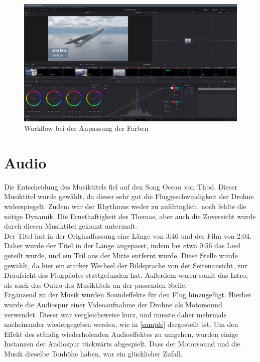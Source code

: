 \begin{figure}[H]
\begin{center}
\includegraphics[width=\textwidth]{gfx/post/resolve7.jpg}
\caption{Workflow bei der Anpassung der Farben}
\label{resolve7}
\end{center}
\end{figure}

\section{Audio}

Die Entscheidung des Musiktitels fiel auf den Song Ocean von Thbd. Dieser Musiktitel wurde gewählt, da dieser sehr gut die Fluggeschwindigkeit der Drohne widerspiegelt. Zudem war der Rhythmus weder zu aufdringlich, noch fehlte die nötige Dynamik. Die Ernsthaftigkeit des Themas, aber auch die Zuversicht wurde durch diesen Musiktitel gekonnt untermalt.\\
Der Titel hat in der Originalfassung eine Länge von 3:46 und der Film von 2:04. Daher wurde der Titel in der Länge angepasst, indem bei etwa 0:56 das Lied geteilt wurde, und ein Teil aus der Mitte entfernt wurde. Diese Stelle wurde gewählt, da hier ein starker Wechsel der Bildsprache von der Seitenansicht, zur Draufsicht des Flugpfades stattgefunden hat. Außerdem waren somit das Intro, als auch das Outro des Musiktitels an der passenden Stelle.\\
Ergänzend zu der Musik wurden Soundeffekte für den Flug hinzugefügt. Hierbei wurde die Audiospur einer Videoaufnahme der Drohne als Motorsound verwendet. Dieser war vergleichsweise kurz, und musste daher mehrmals nacheinander wiedergegeben werden, wie in \autoref{sample} dargestellt ist. Um den Effekt des ständig wiederholenden Audioeffektes zu umgehen, wurden einige Instanzen der Audiospur rückwärts abgespielt. Dass der Motorsound und die Musik dieselbe Tonhöhe haben, war ein glücklicher Zufall.\\

